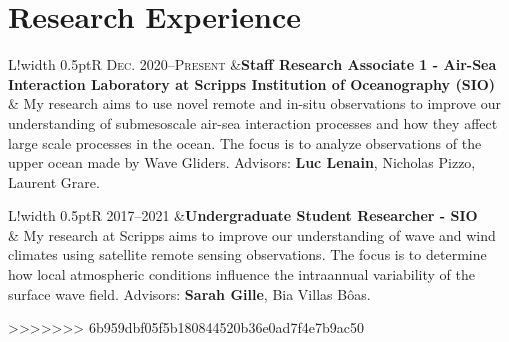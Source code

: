 \documentclass[10pt]{article}
\newcommand\VRule{\color{lightgray}\vrule width 0.5pt}
\begin{document}
\section*{Research Experience}
\vspace{.3cm}
\begin{tabular}{L!{\VRule}R}
\textsc{Dec. 2020--Present} &{\bf Staff Research Associate 1 - Air-Sea Interaction Laboratory at Scripps Institution of Oceanography (SIO)}\\
& My research aims to use novel remote and in-situ observations to improve our understanding of submesoscale air-sea interaction processes and how they affect large scale processes in the ocean. The focus is to analyze observations of the upper ocean made by Wave Gliders. Advisors: \textbf{Luc Lenain}, Nicholas Pizzo, Laurent Grare.\\[5pt]
\end{tabular}
\newline \noindent
\newline \noindent 
\newline \noindent
\begin{tabular}{L!{\VRule}R}
\textsc{2017--2021} &{\bf Undergraduate Student Researcher - SIO }\\
& My research at Scripps aims to improve our understanding of wave and wind climates using satellite remote sensing observations. The focus is to determine how local atmospheric conditions influence the intraannual variability of the surface wave field. Advisors: \textbf{Sarah Gille}, Bia Villas B\^{o}as.\\[5pt]
\end{tabular}

>>>>>>> 6b959dbf05f5b180844520b36e0ad7f4e7b9ac50
\vspace{.3cm}
\end{document}

